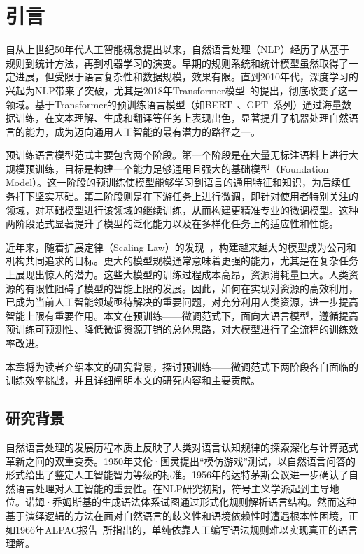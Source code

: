 
\chapter{引言}

自从上世纪50年代人工智能概念提出以来，自然语言处理（NLP）经历了从基于规则到统计方法，再到机器学习的演变。早期的规则系统和统计模型虽然取得了一定进展，但受限于语言复杂性和数据规模，效果有限。直到2010年代，深度学习的兴起为NLP带来了突破，尤其是2018年Transformer模型~\cite{Vaswani+2017}的提出，彻底改变了这一领域。基于Transformer的预训练语言模型（如BERT~\cite{devlin2018bert}、GPT~\cite{radford2018improving}系列）通过海量数据训练，在文本理解、生成和翻译等任务上表现出色，显著提升了机器处理自然语言的能力，成为迈向通用人工智能的最有潜力的路径之一。


预训练语言模型范式主要包含两个阶段。第一个阶段是在大量无标注语料上进行大规模预训练，目标是构建一个能力足够通用且强大的基础模型（Foundation Model）。这一阶段的预训练使模型能够学习到语言的通用特征和知识，为后续任务打下坚实基础。第二阶段则是在下游任务上进行微调，即针对使用者特别关注的领域，对基础模型进行该领域的继续训练，从而构建更精准专业的微调模型。这种两阶段范式显著提升了模型的泛化能力以及在多样化任务上的适应性和性能。

近年来，随着扩展定律（Scaling Law）的发现~\cite{kaplan2020scaling}，构建越来越大的模型成为公司和机构共同追求的目标。更大的模型规模通常意味着更强的能力，尤其是在复杂任务上展现出惊人的潜力。这些大模型的训练过程成本高昂，资源消耗量巨大。人类资源的有限性阻碍了模型的智能上限的发展。因此，如何在实现对资源的高效利用，已成为当前人工智能领域亟待解决的重要问题，对充分利用人类资源，进一步提高智能上限有重要作用。本文在预训练——微调范式下，面向大语言模型，遵循提高预训练可预测性、降低微调资源开销的总体思路，对大模型进行了全流程的训练效率改进。

本章将为读者介绍本文的研究背景，探讨预训练——微调范式下两阶段各自面临的训练效率挑战，并且详细阐明本文的研究内容和主要贡献。


\section{研究背景}

自然语言处理的发展历程本质上反映了人类对语言认知规律的探索深化与计算范式革新之间的双重变奏。1950年艾伦·图灵提出“模仿游戏”测试，以自然语言问答的形式给出了鉴定人工智能智力等级的标准。1956年的达特茅斯会议进一步确认了自然语言处理对人工智能的重要性。在NLP研究初期，符号主义学派起到主导地位。诺姆·乔姆斯基的生成语法体系试图通过形式化规则解析语言结构。然而这种基于演绎逻辑的方法在面对自然语言的歧义性和语境依赖性时遭遇根本性困境，正如1966年ALPAC报告~\cite{ALPAC}所指出的，单纯依靠人工编写语法规则难以实现真正的语言理解。

